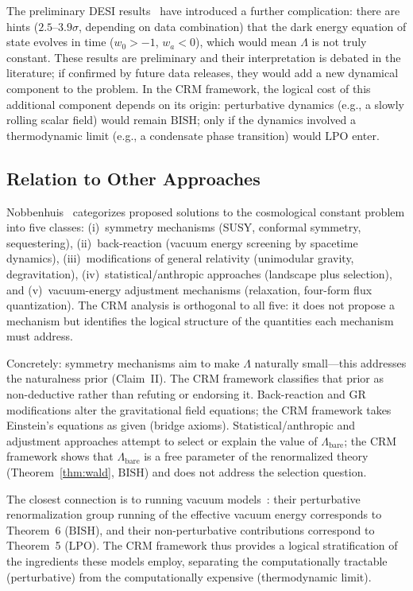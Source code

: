 \documentclass[11pt,a4paper]{article}
\theoremstyle{plain}
\theoremstyle{definition}
\newcommand{\LPO}{\ensuremath{\mathrm{LPO}}}
\newcommand{\BISH}{\ensuremath{\mathrm{BISH}}}
\newcommand{\Lbare}{\Lambda_{\mathrm{bare}}}
\begin{document}
The preliminary DESI results~\cite{DESI2024} have introduced a further
complication: there are hints ($2.5$--$3.9\sigma$, depending on
data combination) that the dark energy equation of state evolves
in time ($w_0 > -1$, $w_a < 0$), which would mean $\Lambda$ is
not truly constant.  These results are preliminary and their
interpretation is debated in the literature; if confirmed by
future data releases, they would add a new dynamical
component to the problem.  In the CRM framework, the logical cost
of this additional component depends on its origin: perturbative
dynamics (e.g., a slowly rolling scalar field) would remain $\BISH$;
only if the dynamics involved a thermodynamic limit (e.g., a
condensate phase transition) would $\LPO$ enter.

\subsection{Relation to Other Approaches}

Nobbenhuis~\cite{Nobbenhuis2006} categorizes proposed solutions to
the cosmological constant problem into five classes:
(i)~symmetry mechanisms (SUSY, conformal symmetry, sequestering),
(ii)~back-reaction (vacuum energy screening by spacetime dynamics),
(iii)~modifications of general relativity (unimodular gravity,
degravitation),
(iv)~statistical/anthropic approaches (landscape plus selection),
and (v)~vacuum-energy adjustment mechanisms (relaxation, four-form
flux quantization).  The CRM analysis is orthogonal to all five:
it does not propose a mechanism but identifies the logical structure
of the quantities each mechanism must address.

Concretely: symmetry mechanisms aim to make $\Lambda$ naturally
small---this addresses the naturalness prior (Claim~II).  The CRM
framework classifies that prior as non-deductive rather than
refuting or endorsing it.  Back-reaction and GR modifications alter
the gravitational field equations; the CRM framework takes
Einstein's equations as given (bridge axioms).
Statistical/anthropic and adjustment approaches attempt to select
or explain the value of $\Lbare$; the CRM framework shows that
$\Lbare$ is a free parameter of the renormalized theory
(Theorem~\ref{thm:wald}, $\BISH$) and does not address the
selection question.

The closest connection is to running vacuum
models~\cite{Sola2013}: their perturbative renormalization group
running of the effective vacuum energy corresponds to Theorem~6
($\BISH$), and their non-perturbative contributions correspond
to Theorem~5 ($\LPO$).  The CRM framework thus provides a
logical stratification of the ingredients these models employ,
separating the computationally tractable (perturbative) from
the computationally expensive (thermodynamic limit).
\end{document}

